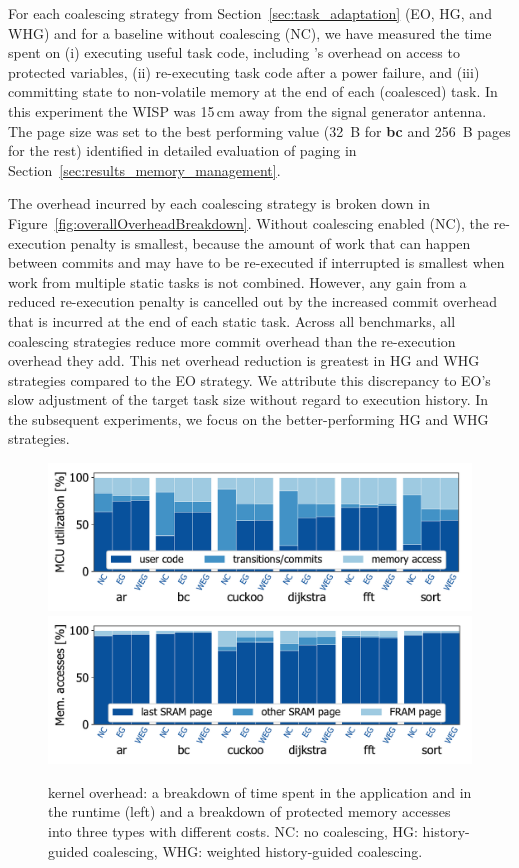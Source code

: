 For each coalescing strategy from Section~\ref{sec:task_adaptation} (EO, HG,
and WHG) and for a baseline without coalescing (NC), we have measured the time
spent on (i) executing useful task code, including \sys's overhead on access to
protected variables, (ii) re-executing task code after a power failure, and
(iii) committing state to non-volatile memory at the end of each (coalesced)
task.  In this experiment the WISP was 15\,cm away from the signal generator
antenna.
%
The page size was set to the best performing value (32~B for \textbf{bc} and
256~B pages for the rest) identified in detailed evaluation of paging in
Section~\ref{sec:results_memory_management}.

The overhead incurred by each coalescing strategy is broken down in
Figure~\ref{fig:overallOverheadBreakdown}. Without coalescing enabled (NC), the
re-execution penalty is smallest, because the amount of work that can happen
between commits and may have to be re-executed if interrupted is smallest when
work from multiple static tasks is not combined.
%
However, any gain from a reduced re-execution penalty is cancelled out by
the increased commit overhead that is incurred at the end of each static
task.
%
Across all benchmarks, all coalescing strategies reduce more commit overhead
than the re-execution overhead they add.
%
This net overhead reduction is greatest in HG and WHG strategies compared
to the EO strategy. We attribute this discrepancy to EO's slow adjustment
of the target task size without regard to execution history.
%
In the subsequent experiments, we focus on the better-performing HG and WHG
strategies.


\begin{figure}
	\centering
	\includegraphics[width=\columnwidth]{figures/overallOverhead}
	\includegraphics[width=\columnwidth]{figures/memAccess}
	\caption{\sys kernel overhead: a breakdown of time spent in
the application and in the runtime (left) and a breakdown of protected memory
accesses into three types with different costs. NC: no coalescing, HG:
history-guided coalescing, WHG: weighted history-guided coalescing.}
	\label{fig:coalEfficiency}
\end{figure}

